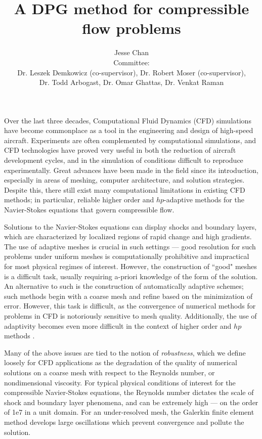 \documentclass[12pt,letterpaper,oneside]{article}
\date{}
\author{Jesse Chan\\Committee: \vspace{-0.3cm}\\Dr. Leszek Demkowicz (co-supervisor), Dr. Robert Moser (co-supervisor),\vspace{-0.3cm}\\ Dr. Todd Arbogast, Dr. Omar Ghattas, Dr. Venkat Raman}
\title{A DPG method for compressible flow problems}
\begin{document}
\maketitle

Over the last three decades, Computational Fluid Dynamics (CFD) simulations have become commonplace as a tool in the engineering and design of high-speed aircraft.  Experiments are often complemented by computational simulations, and CFD technologies have proved very useful in both the reduction of aircraft development cycles, and in the simulation of conditions difficult to reproduce experimentally.  Great advances have been made in the field since its introduction, especially in areas of meshing, computer architecture, and solution strategies.  Despite this, there still exist many computational limitations in existing CFD methods; in particular, reliable higher order and $hp$-adaptive methods for the Navier-Stokes equations that govern compressible flow.

Solutions to the Navier-Stokes equations can display shocks and boundary layers, which are characterized by localized regions of rapid change and high gradients.  The use of adaptive meshes is crucial in such settings --- good resolution for such problems under uniform meshes is computationally prohibitive and impractical for most physical regimes of interest.  However, the construction of ``good" meshes is a difficult task, usually requiring a-priori knowledge of the form of the solution.  An alternative to such is the construction of automatically adaptive schemes; such methods begin with a coarse mesh and refine based on the minimization of error.  However, this task is difficult, as the convergence of numerical methods for problems in CFD is notoriously sensitive to mesh quality.  Additionally, the use of adaptivity becomes even more difficult in the context of higher order and $hp$ methods \cite{BoeingHigherOrder}.  

Many of the above issues are tied to the notion of \emph{robustness}, which we define loosely for CFD applications as the degradation of the quality of numerical solutions on a coarse mesh with respect to the Reynolds number, or nondimensional viscosity. For typical physical conditions of interest for the compressible Navier-Stokes equations, the Reynolds number dictates the scale of shock and boundary layer phenomena, and can be extremely high --- on the order of 1e7 in a unit domain.  For an under-resolved mesh, the Galerkin finite element method develops large oscillations which prevent convergence and pollute the solution.  
\end{document}

